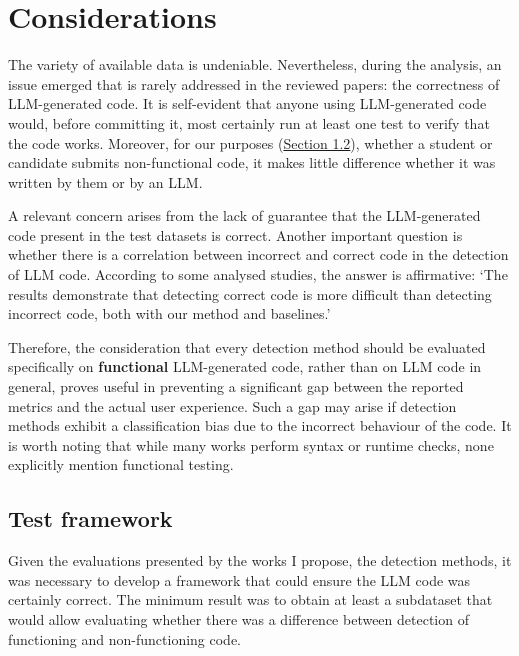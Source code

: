 \clearpage

\section{Considerations}
The variety of available data is undeniable. 
Nevertheless, during the analysis, an issue emerged that is rarely 
addressed in the reviewed papers: the correctness of 
LLM-generated code. It is self-evident that anyone using 
LLM-generated code would, before committing it, 
most certainly run at least one test to verify that the 
code works. Moreover, for our purposes 
(\hyperref[sec:Motivations Behind LLM-Generated Code Detection]{Section 1.2}), 
whether a student or candidate submits non-functional 
code, it makes little difference whether it was written by them or 
by an LLM. 

A relevant concern arises from the lack of guarantee 
that the LLM-generated code present in the test datasets is 
correct. Another important question is whether there is a 
correlation between incorrect and correct code in the detection of 
LLM code. According to some analysed studies, the answer is affirmative: 
‘The results demonstrate that detecting correct code is more difficult 
than detecting incorrect code, both with our method and 
baselines.’~\cite{ye2023uncovering}

Therefore, the consideration that every detection method 
should be evaluated specifically on \textbf{functional} LLM-generated code, 
rather than on LLM code in general, proves useful in preventing a 
significant gap between the reported metrics and the actual user 
experience. Such a gap may arise if detection methods exhibit a 
classification bias due to the incorrect behaviour of the code. 
It is worth noting that while many works perform syntax or runtime 
checks, none explicitly mention functional testing.


\newpage
\subsection{Test framework}
\label{section:Test framework}
Given the evaluations presented by the works I propose, 
the detection methods, it was necessary to develop a framework that 
could ensure the LLM code was certainly correct. The minimum result was 
to obtain at least a subdataset that would allow evaluating whether there was a 
difference between detection of functioning and non-functioning code.

